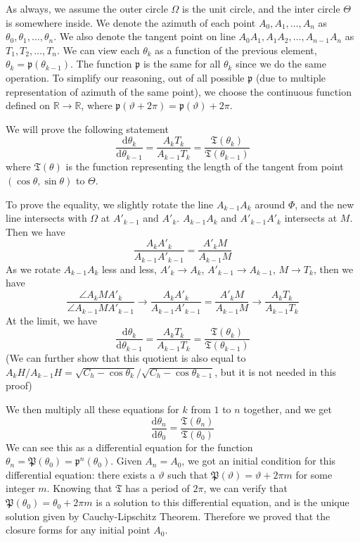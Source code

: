 \documentclass[]{article}
\newcommand{\ud}{\mathrm{d}}
\begin{document}
As always, we assume the outer circle $\Omega$ is the unit circle, and the inter circle $\Theta$ is somewhere inside. We denote the azimuth of each point $A_0, A_1,\dots,A_n$ as $\theta_0,\theta_1,\dots,\theta_n$. We also denote the tangent point on line $A_0A_1, A_1A_2,\dots,A_{n-1}A_n$ as $T_1, T_2,\dots, T_n$. We can view each $\theta_k$ as a function of the previous element, $\theta_k=\mathfrak{p}(\theta_{k-1})$. The function $\mathfrak{p}$ is the same for all $\theta_k$ since we do the same operation. To simplify our reasoning, out of all possible $\mathfrak{p}$ (due to multiple representation of azimuth of the same point), we choose the continuous function defined on $\mathbb{R}\to\mathbb{R}$, where $\mathfrak{p}(\vartheta + 2\pi) = \mathfrak{p}(\vartheta) + 2\pi$.


We will prove the following statement
\[
\frac{\ud \theta_{k}}{\ud \theta_{k-1}} = \frac{A_kT_k}{A_{k-1}T_{k}} = \frac{\mathfrak{T}(\theta_{k})}{\mathfrak{T}(\theta_{k-1})}
\]
where $\mathfrak{T}(\theta)$ is the function representing the length of the tangent from point $(\cos\theta, \sin\theta)$ to $\Theta$. 

To prove the equality, we slightly rotate the line $A_{k-1} A_k$ around $\Phi$, and the new line intersects with $\Omega$ at $A'_{k-1}$ and $A'_k$. $A_{k-1} A_k$ and $A'_{k-1} A'_k$ intersects at $M$. Then we have
\[
\frac{A_k A'_k}{A_{k-1}A'_{k-1}} = \frac{A'_{k}M}{A_{k-1}M}
\]
As we rotate $A_{k-1} A_k$ less and less, $A'_k \to A_k$, $A'_{k-1} \to A_{k-1}$, $M\to T_k$, then we have
\[
\frac{\angle A_k M  A'_k}{\angle A_{k-1} M A'_{k-1}} \to \frac{A_k A'_k}{A_{k-1}A'_{k-1}} = \frac{A'_{k}M}{A_{k-1}M} \to \frac{A_{k}T_k}{A_{k-1}T_k}
\]
At the limit, we have
\[
\frac{\ud \theta_{k}}{\ud \theta_{k-1}} = \frac{A_kT_k}{A_{k-1}T_{k}} =  \frac{\mathfrak{T}(\theta_{k})}{\mathfrak{T}(\theta_{k-1})}
\]
(We can further show that this quotient is also equal to $A_kH/A_{k-1}H = \sqrt{C_h-\cos\theta_k}/\sqrt{C_h-\cos\theta_{k-1}}$, but it is not needed in this proof)

We then multiply all these equations for $k$ from $1$ to $n$ together, and we get
\[
\frac{\ud \theta_{n}}{\ud \theta_{0}}  = \frac{\mathfrak{T}(\theta_{n})}{\mathfrak{T}(\theta_{0})}
\]
We can see this as a differential equation for the function $\theta_n = \mathfrak{P}(\theta_0) =\mathfrak{p}^n(\theta_0)$. Given $A_n = A_0$, we got an initial condition for this differential equation: there exists a $\vartheta$ such that $\mathfrak{P}(\vartheta) = \vartheta + 2\pi m$ for some integer $m$. Knowing that $\mathfrak{T}$ has a period of $2\pi$, we can verify that $\mathfrak{P}(\theta_0) = \theta_0 + 2\pi m$ is a solution to this differential equation, and is the unique solution given by Cauchy-Lipschitz Theorem. Therefore we proved that the closure forms for any initial point $A_0$.
 
\end{document}
